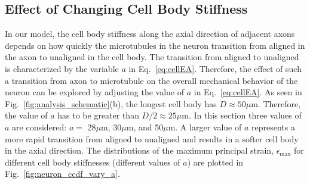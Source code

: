\documentclass[10pt]{asme2ej}
\begin{document}
\subsection{Effect of Changing Cell Body Stiffness}
In our model, the cell body stiffness along the axial direction of adjacent axons depends on how quickly the microtubules in the neuron transition from aligned in the axon to unaligned in the cell body. The transition from aligned to unaligned is characterized by the variable $a$ in Eq.\ \eqref{eq:cellEA}. Therefore, the effect of such a transition from axon to microtubule on the overall mechanical behavior of the neuron can be explored by adjusting the value of $a$ in Eq.\ \eqref{eq:cellEA}. As seen in Fig.\ \ref{fig:analysis_schematic}(b), the longest cell body has $D \approx 50\mu$m. Therefore, the value of $a$ has to be greater than $D/2 \approx 25\mu$m. In this section three values of $a$ are considered: $a=$ 28$\mu$m, 30$\mu$m, and 50$\mu$m. A larger value of $a$ represents a more rapid transition from aligned to unaligned and results in a softer cell body in the axial direction. The distributions of the maximum principal strain, $\epsilon_{\text{max}}$ for different cell body stiffnesses (different values of $a$) are plotted in Fig.\ \ref{fig:neuron_ccdf_vary_a}.
%
\end{document}
